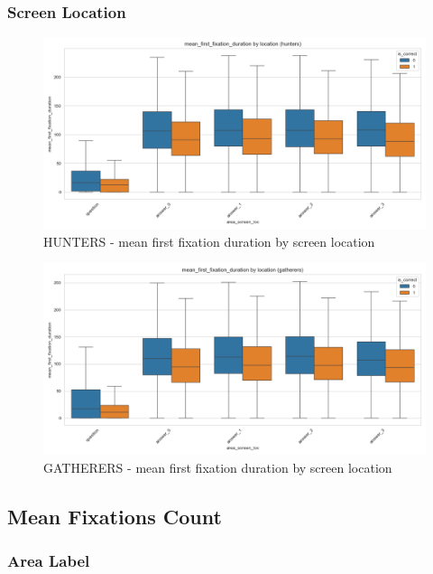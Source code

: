 \documentclass{article}
\begin{document}
\subsubsection{Screen Location}

\begin{figure}[H]
    \centering
    \includegraphics[width=0.8\linewidth]{plots/boxplots/boxplot_area_screen_loc_mean_first_fixation_duration_hunters.png}
    \caption{HUNTERS - mean first fixation duration by screen location}
    \label{fig:ff_hunt_sl}
\end{figure}

\begin{figure}[H]
    \centering
    \includegraphics[width=0.8\linewidth]{plots/boxplots/boxplot_area_screen_loc_mean_first_fixation_duration_gatherers.png}
    \caption{GATHERERS - mean first fixation duration by screen location}
    \label{fig:ff_gath_sl}
\end{figure}



\subsection{Mean Fixations Count}
\subsubsection{Area Label}
\end{document}
